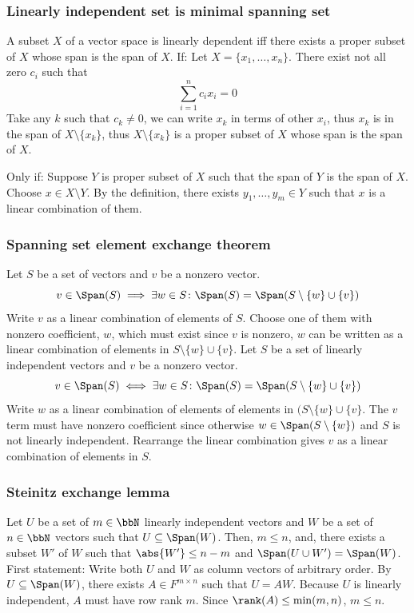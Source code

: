 \documentclass[a4paper,12pt]{report}
\begin{document}
\subsubsection{Linearly independent set is minimal spanning set}
A subset $X$ of a vector space is linearly dependent iff there exists a proper subset of $X$ whose span is the span of $X$.
\bpr
If: Let $X=\{x_1,\ldots,x_n\}$. There exist not all zero $c_i$ such that
\[\sum_{i=1}^nc_ix_i=0\]
Take any $k$ such that $c_k\ne 0$, we can write $x_k$ in terms of other $x_i$, thus $x_k$ is in the span of $X\setminus\{x_k\}$, thus $X\setminus\{x_k\}$ is a proper subset of $X$ whose span is the span of $X$.

Only if: Suppose $Y$ is proper subset of $X$ such that the span of $Y$ is the span of $X$. Choose $x\in X\setminus Y$. By the definition, there exists $y_1,\ldots,y_m\in Y$ such that $x$ is a linear combination of them.
\epr
\subsubsection{Spanning set element exchange theorem}
Let $S$ be a set of vectors and $v$ be a nonzero vector.
\[v\in\Span(S)\implies\exists w\in S\colon \Span(S)=\Span(S\setminus\{w\}\cup\{v\})\]
\bpr
Write $v$ as a linear combination of elements of $S$. Choose one of them with nonzero coefficient, $w$, which must exist since $v$ is nonzero, $w$ can be written as a linear combination of elements in $S\setminus\{w\}\cup\{v\}$.
\epr
Let $S$ be a set of linearly independent vectors and $v$ be a nonzero vector.
\[v\in\Span(S)\iff\exists w\in S\colon \Span(S)=\Span(S\setminus\{w\}\cup\{v\})\]
\bpr
Write $w$ as a linear combination of elements of elements in $(S\setminus\{w\}\cup\{v\}$. The $v$ term must have nonzero coefficient since otherwise $w\in\Span(S\setminus\{w\})$ and $S$ is not linearly independent. Rearrange the linear combination gives $v$ as a linear combination of elements in $S$.
\epr
\subsubsection{Steinitz exchange lemma}
Let $U$ be a set of $m\in\bbN$ linearly independent vectors and $W$ be a set of $n\in\bbN$ vectors such that $U\subseteq\Span(W)$. Then, $m\le n$, and, there exists a subset $W'$ of $W$ such that $\abs{W'}\le n-m$ and $\Span(U\cup W')=\Span(W)$.
\bpr
First statement: Write both $U$ and $W$ as column vectors of arbitrary order. By $U\subseteq\Span(W)$, there exists $A\in F^{m\times n}$ such that $U=AW$. Because $U$ is linearly independent, $A$ must have row rank $m$. Since $\rank(A)\le\min(m,n)$, $m\le n$.
\end{document}
